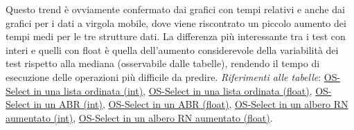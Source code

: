 \documentclass[onecolumn]{article}
\begin{document}
Questo trend è ovviamente confermato dai grafici con tempi relativi e anche dai grafici per i dati a virgola mobile, dove viene riscontrato un piccolo aumento dei tempi medi per le tre strutture dati. La differenza più interessante tra i test con interi e quelli con float è quella dell'aumento considerevole della variabilità dei test rispetto alla mediana (osservabile dalle tabelle), rendendo il tempo di esecuzione delle operazioni più difficile da predire.
\newline
\newline
\textit{Riferimenti alle tabelle}: \hyperref[label:lista-ordinata-s-os-select]{OS-Select in una lista ordinata (int)}, \hyperref[label:lista-ordinata-s-float-os-select]{OS-Select in una lista ordinata (float)}, \hyperref[label:abr-s-os-select]{OS-Select in un ABR (int)}, \hyperref[label:abr-s-float-os-select]{OS-Select in un ABR (float)}, \hyperref[label:rn-aumentato-s-os-select]{OS-Select in un albero RN aumentato (int)}, \hyperref[label:rn-aumentato-s-float-os-select]{OS-Select in un albero RN aumentato (float)}.
\end{document}
